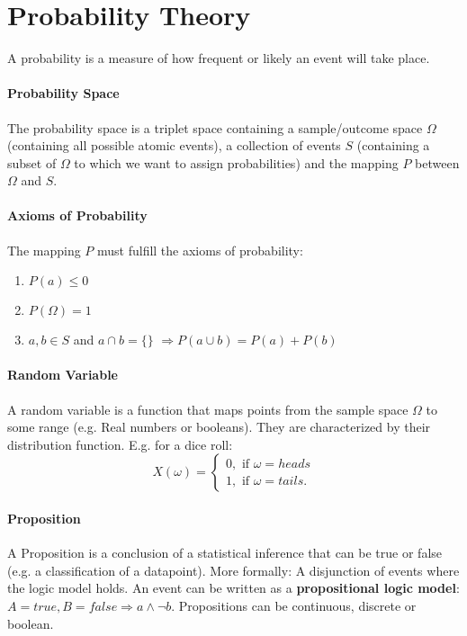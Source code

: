 \documentclass[../main.tex]{subfiles}
\begin{document}
\section{Probability Theory} \label{probability}
A probability is a measure of how frequent or likely an event will take place. 

\paragraph{Probability Space}  The probability space is a triplet space containing a sample/outcome space $\Omega$ (containing all possible atomic events), a collection of events $S$ (containing a subset of $\Omega$ to which we want to assign probabilities) and the mapping $P$ between $\Omega$ and $S$. 
\paragraph{Axioms of Probability}  The mapping $P$ must fulfill the axioms of probability: 
        \begin{enumerate}
            \item $P(a) \leq 0$
            \item $P(\Omega) = 1$
            \item $a,b \in S$ and $a \cap b = \{\}$ $ \Rightarrow P(a \cup b) = P(a) + P(b)$
        \end{enumerate}
\paragraph{Random Variable}  A random variable is a function that maps points from the sample space $\Omega$ to some range (e.g. Real numbers or booleans). They are characterized by their distribution function. E.g. for a dice roll:
        \[ X(\omega) = \begin{cases} 
            0, \text{ if } \omega = heads\\
            1, \text{ if } \omega = tails.
        \end{cases}
        \]
\paragraph{Proposition}  A Proposition is a conclusion of a statistical inference that can be true or false (e.g. a classification of a datapoint). More formally: A disjunction of events where the logic model holds. An event can be written as a \textbf{propositional logic model}:\\ $A = true, B = false \Rightarrow a \land \neg b $. Propositions can be continuous, discrete or boolean. 
\end{document}
